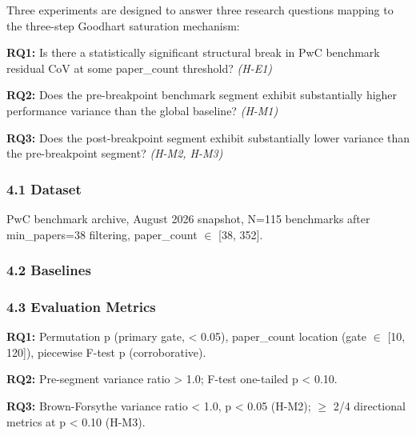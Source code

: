 
Three experiments are designed to answer three research questions mapping to the three-step Goodhart saturation mechanism:

\textbf{RQ1:} Is there a statistically significant structural break in PwC benchmark residual CoV at some paper\_count threshold? \textit{(H-E1)}

\textbf{RQ2:} Does the pre-breakpoint benchmark segment exhibit substantially higher performance variance than the global baseline? \textit{(H-M1)}

\textbf{RQ3:} Does the post-breakpoint segment exhibit substantially lower variance than the pre-breakpoint segment? \textit{(H-M2, H-M3)}

\subsubsection{4.1 Dataset}

PwC benchmark archive, August 2026 snapshot, N=115 benchmarks after min\_papers=38 filtering, paper\_count $\in$ [38, 352].

\subsubsection{4.2 Baselines}

\begin{table}[htbp]
\centering
{}
\end{table}

\subsubsection{4.3 Evaluation Metrics}

\textbf{RQ1:} Permutation p (primary gate, < 0.05), paper\_count\* location (gate $\in$ [10, 120]), piecewise F-test p (corroborative).

\textbf{RQ2:} Pre-segment variance ratio > 1.0; F-test one-tailed p < 0.10.

\textbf{RQ3:} Brown-Forsythe variance ratio < 1.0, p < 0.05 (H-M2); $\geq$ 2/4 directional metrics at p < 0.10 (H-M3).


